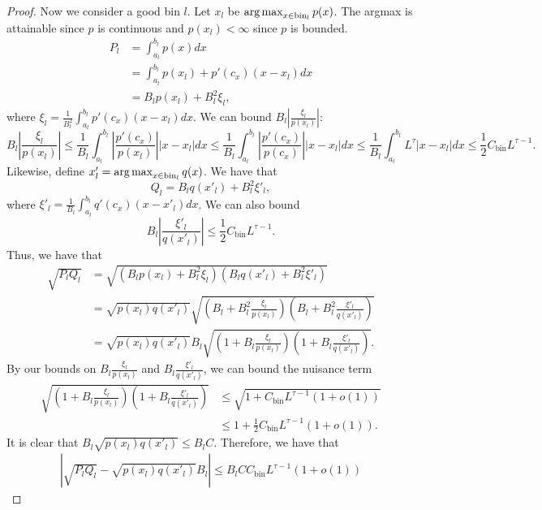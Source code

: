 \documentclass{article}
\newcommand{\bin}{\text{bin}}
\begin{document}
\begin{proof}
Now we consider a good bin $l$. Let $x_l$ be $\argmax_{x \in \bin_l} p(x)$. The argmax is attainable since $p$ is continuous and $p(x_l) < \infty$ since $p$ is bounded.
\begin{align*}
P_l &= \int_{a_l}^{b_l} p(x) dx \\
   &= \int_{a_l}^{b_l} p(x_l) + p'(c_x)(x-x_l) dx \\
   &= B_l p(x_l) + B_l^2 \xi_l,
\end{align*}
where $\xi_l = \frac{1}{B_l^2} \int_{a_l}^{b_l} p'(c_x)(x - x_l)dx$. We can bound $B_l \left| \frac{\xi_l}{p(x_l)} \right|$:
$$
B_l \left| \frac{\xi_l}{p(x_l)} \right| 
    \leq \frac{1}{B_l} \int_{a_l}^{b_l} \left|\frac{p'(c_x)}{p(x_l)} \right| |x - x_l| dx 
   \leq \frac{1}{B_l} \int_{a_l}^{b_l} \left|\frac{p'(c_x)}{p(c_x)} \right| |x - x_l| dx 
                \leq \frac{1}{B_l} \int_{a_l}^{b_l} L^{\tau} |x - x_l| dx \leq 
 \frac{1}{2} C_\bin L^{\tau - 1}. 
$$ 
Likewise, define $x'_l = \argmax_{x \in \bin_l} q(x)$. We have that
\[
Q_l = B_l q(x'_l) + B_l^2 \xi'_l,
\]
where $\xi'_l = \frac{1}{B_l} \int_{a_l}^{b_l} q'(c_x) (x - x'_l) dx$. We can also bound 
\[
B_l \left| \frac{\xi'_l}{q(x'_l)} \right| \leq \frac{1}{2} C_\bin L^{\tau - 1}.
\]
Thus, we have that
\begin{align*}
 \sqrt{P_l Q_l} &= \sqrt{ (B_l p(x_l) + B_l^2 \xi_l) 
                           (B_l q(x'_l) + B_l^2 \xi'_l) } \\
    &= \sqrt{p(x_l) q(x'_l)} \sqrt{ (B_l + B_l^2 \frac{\xi_l}{p(x_l)} ) 
                                           (B_l + B_l^2 \frac{\xi'_l}{q(x'_l)} ) } \\
   &=  \sqrt{p(x_l) q(x'_l)} B_l \sqrt{ (1 + B_l \frac{\xi_l}{p(x_l)} ) 
                                           (1 + B_l \frac{\xi'_l}{q(x'_l)} ) }.
\end{align*}
By our bounds on $ B_l \frac{\xi_l}{p(x_l)} $ and $B_l  \frac{\xi'_l}{q(x'_l)}$, we can bound the nuisance term 
\begin{align*}
 \sqrt{ (1 + B_l \frac{\xi_l}{p(x_l)} ) 
         (1 + B_l \frac{\xi'_l}{q(x'_l)} ) } &\leq \sqrt{ 1 + C_\bin L^{\tau - 1} (1+o(1))} \\
   &\leq 1 + \frac{1}{2} C_\bin L^{\tau - 1} (1 + o(1)).
\end{align*}
It is clear that $B_l \sqrt{p(x_l)q(x'_l)} \leq B_l C$. Therefore, we have that
\begin{align}
\label{eqn:discrete_riemann_bound2}
\left| \sqrt{ P_l Q_l} -  \sqrt{ p(x_l) q(x'_l)} B_l \right| \leq 
     B_l C C_\bin L^{\tau - 1}(1 + o(1))
\end{align}

\end{proof}
\end{document}
